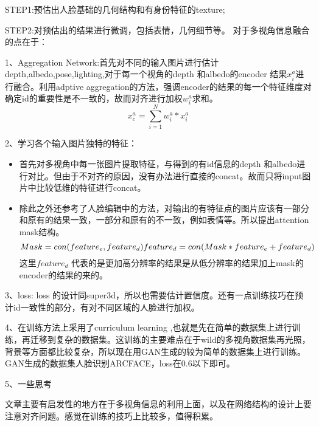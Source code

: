 \documentclass[UTF8,12pt]{article} %
\theoremstyle{definition}
\begin{document}
STEP1:预估出人脸基础的几何结构和有身份特征的texture;

STEP2:对预估出的结果进行微调，包括表情，几何细节等。
对于多视角信息融合的点在于：


1、Aggregation Network:首先对不同的输入图片进行估计depth,albedo,pose,lighting,对于每一个视角的depth 和albedo的encoder 结果$x_i^a$进行融合。利用adptive  aggregation的方法，强调encoder的结果的每一个特征维度对确定id的重要性是不一致的，故而对齐进行加权$w_i^a$求和。
$$
x_c^a = \sum_{i=1}^{N}w_i^a * x_i^a
$$

2、学习各个输入图片独特的特征：

\begin{itemize}
	\item 首先对多视角中每一张图片提取特征，与得到的有id信息的depth 和albedo进行对比。但由于不对齐的原因，没有办法进行直接的concat。故而只将input图片中比较低维的特征进行concat。
	\item 除此之外还参考了人脸编辑中的方法，对输出的有特征点的图片应该有一部分和原有的结果一致，一部分和原有的不一致，例如表情等。所以提出attention mask结构。
	$$
	Mask = con(feature_e,feature_d) \\
	feature_d = con(Mask*feature_e+feature_d)
	$$
	这里$feature_d$ 代表的是更加高分辨率的结果是从低分辨率的结果加上mask的encoder的结果的来的。
\end{itemize}

3、loss:
loss 的设计同super3d，所以也需要估计置信度。还有一点训练技巧在预计id一致性的部分，有对不同区域的人脸进行加权。

4、在训练方法上采用了curriculum learning ,也就是先在简单的数据集上进行训练，再迁移到复杂的数据集。这训练的主要难点在于wild的多视角数据集再光照，背景等方面都比较复杂，所以现在用GAN生成的较为简单的数据集上进行训练。GAN生成的数据集人脸识别ARCFACE，loss在0.6以下即可。


5、一些思考

文章主要有启发性的地方在于多视角信息的利用上面，以及在网络结构的设计上要注意对齐问题。感觉在训练的技巧上比较多，值得积累。
\end{document}
